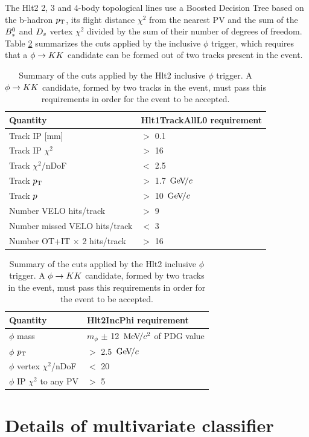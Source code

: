 The Hlt2 2, 3 and 4-body topological lines use a Boosted Decision Tree based on the b-hadron $\mbox{$p_{\mathrm{ T}}$}$,
its flight distance $\chi^{2}$ from the nearest PV and the sum of the ${{B}^0_{s}}$ and ${{D}_{s}}$ vertex $\chi^{2}$ divided by the sum of their number of degrees of freedom.
Table \ref{table:HLT1Phi} summarizes the cuts applied by the inclusive $\phi$ trigger, which requires that a $\phi\rightarrow{\ensuremath{K}}{\ensuremath{K}}$ candidate can be formed out of two tracks present in the event.
\begin{table}[h]
\centering
\caption{Summary of the cuts applied by the Hlt1TrackAllL0 trigger for Run-I. At least one of the six decay particles must pass this requirements, in order for the event to be accepted.}
 \begin{tabular}{l l}
  \hline
Quantity & Hlt1TrackAllL0 requirement \\
  \hline
   \hline
Track IP [mm] & $>$ 0.1\\
Track IP $\chi^{2}$ & $>$ 16\\
Track $\chi^{2}$/nDoF & $<$ 2.5\\
Track $\mbox{$p_{\mathrm{ T}}$}$ & $>$ 1.7 ${\mathrm{\,Ge\kern -0.1em V\!/}c}$\\
Track $\mbox{$p$}$ & $>$ 10 ${\mathrm{\,Ge\kern -0.1em V\!/}c}$\\
Number VELO hits/track & $>$ 9\\
Number missed VELO hits/track & $<$ 3\\
Number OT+IT $\times$ 2 hits/track & $>$ 16\\
 \hline
\end{tabular}
\label{table:HLT1}

\centering
\caption{Summary of the cuts applied by the Hlt2 inclusive $\phi$ trigger. 
A $\phi\rightarrow{\ensuremath{K}}{\ensuremath{K}}$ candidate, formed by two tracks in the event, must pass this requirements in order for the event to be accepted.}
 \begin{tabular}{l l}
 \hline
Quantity & Hlt2IncPhi requirement \\
  \hline
   \hline
$\phi$ mass & $m_{\phi}$ $\pm$ 12 ${\mathrm{\,Me\kern -0.1em V\!/}c^2}$ of PDG value\\
$\phi$ $\mbox{$p_{\mathrm{ T}}$}$ & $>$ 2.5 ${\mathrm{\,Ge\kern -0.1em V\!/}c}$\\
$\phi$ vertex $\chi^{2}$/nDoF & $<$ 20\\
$\phi$ IP $\chi^{2}$ to any PV & $>$ 5\\
 \hline
\end{tabular}
\label{table:HLT1Phi}
\end{table}


\clearpage
\section{Details of multivariate classifier}
\label{sec:appendix_BDT}

